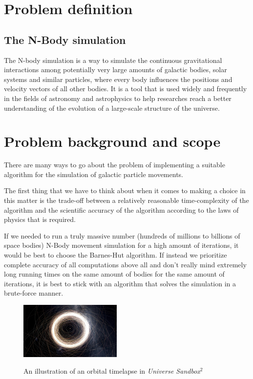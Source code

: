 \documentclass[journal]{IEEEtran}
\begin{document}
	\section{Problem definition}
	
	\subsection*{The N-Body simulation}
	
		The N-body simulation is a way to simulate the continuous gravitational interactions among potentially very large amounts of galactic bodies, solar systems and similar particles, where every body influences the positions and velocity vectors of all other bodies. It is a tool that is used widely and frequently in the fields of astronomy and astrophysics to help researches reach a better understanding of the evolution of a large-scale structure of the universe.\cite{scholarpedia}
		
	\newpage
	
	\section{Problem background and scope}
	
		There are many ways to go about the problem of implementing a suitable algorithm for the simulation of galactic particle movements. 
		
		The first thing that we have to think about when it comes to making a choice in this matter is the trade-off between a relatively reasonable time-complexity of the algorithm and the scientific accuracy of the algorithm according to the laws of physics that is required.
		
		If we needed to run a truly massive number (hundreds of millions to billions of space bodies) N-Body movement simulation for a high amount of iterations, it would be best to choose the Barnes-Hut algorithm. If instead we prioritize complete accuracy of all computations above all and don't really mind extremely long running times on the same amount of bodies for the same amount of iterations, it is best to stick with an algorithm that solves the simulation in a brute-force manner.
	
	\begin{figure}[ht]
		\centering
		\includegraphics[width=0.45\textwidth]{sandbox2.jpg}
		\caption{An illustration of an orbital timelapse in \textit{Universe Sandbox$^2$}}
		\cite{nbodypic}
	\end{figure} 
	
\end{document}
